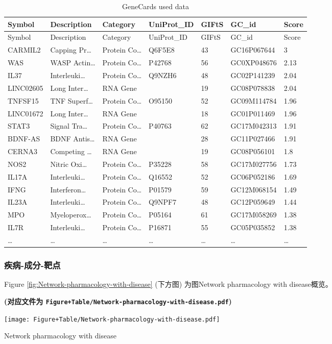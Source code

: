 \documentclass[
]{article}
\begin{document}
\begin{longtable}[]{@{}lllllll@{}}
\caption{\label{tab:GeneCards-used-data}GeneCards used data}\tabularnewline
\toprule
Symbol & Description & Category & UniProt\_ID & GIFtS & GC\_id & Score\tabularnewline
\midrule
\endfirsthead
\toprule
Symbol & Description & Category & UniProt\_ID & GIFtS & GC\_id & Score\tabularnewline
\midrule
\endhead
CARMIL2 & Capping Pr\ldots{} & Protein Co\ldots{} & Q6F5E8 & 43 & GC16P067644 & 3\tabularnewline
WAS & WASP Actin\ldots{} & Protein Co\ldots{} & P42768 & 56 & GC0XP048676 & 2.13\tabularnewline
IL37 & Interleuki\ldots{} & Protein Co\ldots{} & Q9NZH6 & 48 & GC02P141239 & 2.04\tabularnewline
LINC02605 & Long Inter\ldots{} & RNA Gene & & 19 & GC08P078838 & 2.04\tabularnewline
TNFSF15 & TNF Superf\ldots{} & Protein Co\ldots{} & O95150 & 52 & GC09M114784 & 1.96\tabularnewline
LINC01672 & Long Inter\ldots{} & RNA Gene & & 18 & GC01P011469 & 1.96\tabularnewline
STAT3 & Signal Tra\ldots{} & Protein Co\ldots{} & P40763 & 62 & GC17M042313 & 1.91\tabularnewline
BDNF-AS & BDNF Antis\ldots{} & RNA Gene & & 28 & GC11P027466 & 1.91\tabularnewline
CERNA3 & Competing \ldots{} & RNA Gene & & 19 & GC08P056101 & 1.8\tabularnewline
NOS2 & Nitric Oxi\ldots{} & Protein Co\ldots{} & P35228 & 58 & GC17M027756 & 1.73\tabularnewline
IL17A & Interleuki\ldots{} & Protein Co\ldots{} & Q16552 & 52 & GC06P052186 & 1.69\tabularnewline
IFNG & Interferon\ldots{} & Protein Co\ldots{} & P01579 & 59 & GC12M068154 & 1.49\tabularnewline
IL23A & Interleuki\ldots{} & Protein Co\ldots{} & Q9NPF7 & 48 & GC12P059649 & 1.44\tabularnewline
MPO & Myeloperox\ldots{} & Protein Co\ldots{} & P05164 & 61 & GC17M058269 & 1.38\tabularnewline
IL7R & Interleuki\ldots{} & Protein Co\ldots{} & P16871 & 55 & GC05P035852 & 1.38\tabularnewline
\ldots{} & \ldots{} & \ldots{} & \ldots{} & \ldots{} & \ldots{} & \ldots{}\tabularnewline
\bottomrule
\end{longtable}

\hypertarget{ux75beux75c5-ux6210ux5206-ux9776ux70b9}{%
\subsubsection{疾病-成分-靶点}\label{ux75beux75c5-ux6210ux5206-ux9776ux70b9}}

Figure \ref{fig:Network-pharmacology-with-disease} (下方图) 为图Network pharmacology with disease概览。

\textbf{(对应文件为 \texttt{Figure+Table/Network-pharmacology-with-disease.pdf})}

\def\@captype{figure}
\begin{center}
\texttt{[image: Figure+Table/Network-pharmacology-with-disease.pdf]}
\caption{Network pharmacology with disease}\label{fig:Network-pharmacology-with-disease}
\end{center}
\end{document}
